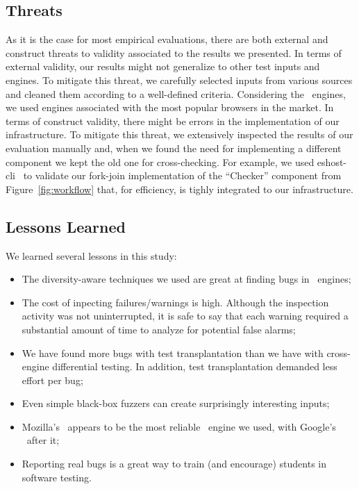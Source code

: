 \documentclass[10pt,conference,anonymous]{IEEEtran}
\begin{document}
\subsection{Threats}

As it is the case for most empirical evaluations, there are both
external and construct threats to validity associated to the results
we presented. In terms of external validity, our results might not
generalize to other test inputs and engines. To mitigate this threat,
we carefully selected inputs from various sources and cleaned them
according to a well-defined criteria. Considering the \js\ engines, we
used engines associated with the most popular browsers in the
market. In terms of construct validity, there might be errors in the
implementation of our infrastructure. To mitigate this threat, we
extensively inspected the results of our evaluation manually and, when
we found the need for implementing a different component we kept the
old one for cross-checking. For example, we used
eshost-cli~\cite{eshost-cli} to validate our fork-join implementation
of the ``Checker'' component from Figure~\ref{fig:workflow} that, for
efficiency, is tighly integrated to our infrastructure.

\subsection{Lessons Learned}
\label{sec:lessons}

We learned several lessons in this study:

\begin{itemize}
  \item The diversity-aware techniques we used are great
    at finding bugs in \js\ engines;
  \item The cost of inpecting failures/warnings is high. Although the
    inspection activity was not uninterrupted, it is safe to say that
    each warning required a substantial amount of time to analyze for
    potential false alarms;
  \item We have found more bugs with test transplantation than we have
    with cross-engine differential testing. In addition, test
    transplantation demanded less effort per bug;
  \item Even simple black-box fuzzers can create surprisingly
    interesting inputs;
  \item Mozilla's \smonkey\ appears to be the most reliable
    \js\ engine we used, with Google's \veight\ after it;
  \item Reporting real bugs is a great way to train (and encourage)
    students in software testing.
\end{itemize}
\end{document}
